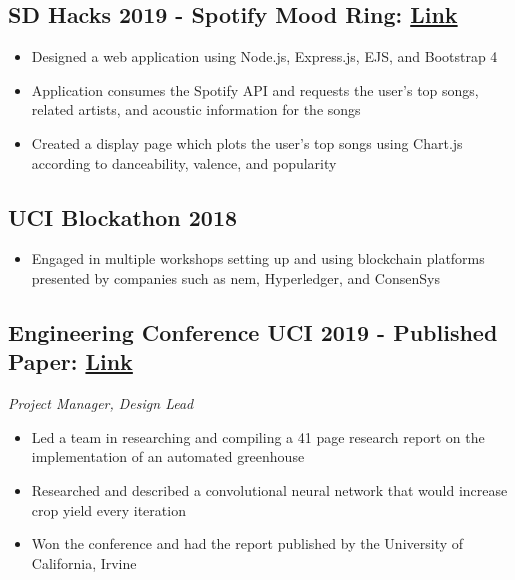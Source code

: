 \documentclass[10pt]{article}
\begin{document}
\begin{multicols}{2}

\subsection{SD Hacks 2019 - Spotify Mood Ring: \href{http://spotifymoodring.herokuapp.com/}{Link}}

\begin{itemize}
	\setlength\itemsep{0em}
	\item Designed a web application using Node.js, Express.js, EJS, and Bootstrap 4
	\item Application consumes the Spotify API and requests the user's top songs, related artists, and acoustic information for the songs
	\item Created a display page which plots the user's top songs using Chart.js according to danceability, valence, and popularity
\end{itemize}

\vfill

\subsection{UCI Blockathon 2018}

\begin{itemize}
	\setlength\itemsep{0em}
	\item Engaged in multiple workshops setting up and using blockchain platforms presented by companies such as nem, 
Hyperledger, and ConsenSys
\end{itemize}

\vfill\null
\columnbreak

\subsection{Engineering Conference UCI 2019 - Published Paper: \href{https://escholarship.org/uc/item/3hm5q8b8}{Link}}

\noindent\textit{Project Manager, Design Lead}

\begin{itemize}
	\setlength\itemsep{0em}
	\item Led a team in researching and compiling a 41 page research report on the implementation of an automated greenhouse 
	\item Researched and described a convolutional neural network that would increase crop yield every iteration
	\item Won the conference and had the report published by the University of California, Irvine
\end{itemize}


\end{multicols}
\end{document}
